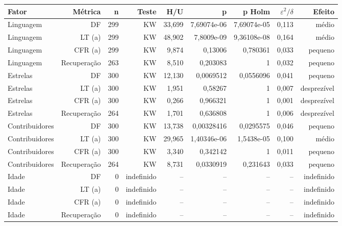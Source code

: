 {\footnotesize
\begin{tabular}{lrrrrrrrr}
\hline
Fator & Métrica & n & Teste & H/U & p & p Holm & $\varepsilon^2/\delta$ & Efeito \\
\hline
Linguagem & DF & 299 & KW & 33,699 & 7,69074e-06 & 7,69074e-05 & 0,113 & médio \\
Linguagem & LT (a) & 299 & KW & 48,902 & 7,8009e-09 & 9,36108e-08 & 0,164 & médio \\
Linguagem & CFR (a) & 299 & KW & 9,874 & 0,13006 & 0,780361 & 0,033 & pequeno \\
Linguagem & Recuperação & 263 & KW & 8,510 & 0,203083 & 1 & 0,032 & pequeno \\
Estrelas & DF & 300 & KW & 12,130 & 0,0069512 & 0,0556096 & 0,041 & pequeno \\
Estrelas & LT (a) & 300 & KW & 1,951 & 0,58267 & 1 & 0,007 & desprezível \\
Estrelas & CFR (a) & 300 & KW & 0,266 & 0,966321 & 1 & 0,001 & desprezível \\
Estrelas & Recuperação & 264 & KW & 1,701 & 0,636808 & 1 & 0,006 & desprezível \\
Contribuidores & DF & 300 & KW & 13,738 & 0,00328416 & 0,0295575 & 0,046 & pequeno \\
Contribuidores & LT (a) & 300 & KW & 29,965 & 1,40346e-06 & 1,5438e-05 & 0,100 & médio \\
Contribuidores & CFR (a) & 300 & KW & 3,340 & 0,342142 & 1 & 0,011 & pequeno \\
Contribuidores & Recuperação & 264 & KW & 8,731 & 0,0330919 & 0,231643 & 0,033 & pequeno \\
Idade & DF & 0 & indefinido & -- & -- & -- & -- & indefinido \\
Idade & LT (a) & 0 & indefinido & -- & -- & -- & -- & indefinido \\
Idade & CFR (a) & 0 & indefinido & -- & -- & -- & -- & indefinido \\
Idade & Recuperação & 0 & indefinido & -- & -- & -- & -- & indefinido \\
\hline
\end{tabular}
}

